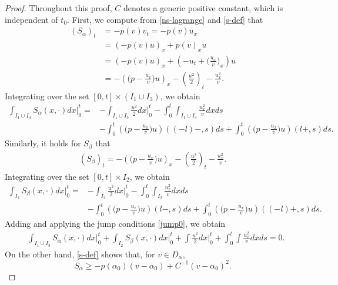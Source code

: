 \documentclass[a4paper,oneside,11pt]{article}
\numberwithin{equation}{section}
\begin{document}
\begin{proof}
Throughout this proof, \( C \) denotes a generic positive constant, which is independent of \( t_{0} \). First, we compute from \eqref{ns-lagrange} and \eqref{s-def} that
\begin{align*}
\left(S_\alpha\right)_t&=-p(v)v_t=-p(v)u_x\\
&=\left(-p(v)u\right)_x+p(v)_xu\\
&=\left(-p(v)u\right)_x+\left(-u_t+\big(\frac{u_{x}}{v}\big)_{x}\right)u\\
&=-\left(\big(p-\frac{u_{x}}{v}\big)u\right)_x-\left(\frac{u^2}{2}\right)_t-\frac{u_{x}^2}{v}.
\end{align*}
Integrating over the set \( [0, t] \times(I_1\cup I_3) \), we obtain
 \begin{align*}
 \int_{I_1\cup I_3} S_\alpha(x, \cdot) d x\Big|_0^{t}=&-\int_{I_1\cup I_3} \frac{u^2}{2}d x\Big|_0^{t}-\int_0^t \int_{I_1\cup I_3}\frac{u_{x}^2}{v}d x d s\\&-\int_0^t\left(\big(p-\frac{u_{x}}{v}\big)u\right)((-l)-, s)d s+\int_0^t\left(\big(p-\frac{u_{x}}{v}\big)u\right)(l+, s)d s.
\end{align*}
Similarly, it holds for \( S_\beta \) that
\begin{align*}
\left(S_\beta\right)_t=-\left(\big(p-\frac{u_{x}}{v}\big)u\right)_x-\left(\frac{u^2}{2}\right)_t-\frac{u_{x}^2}{v}.
\end{align*}
Integrating over the set \( [0, t] \times I_2 \), we obtain
 \begin{align*}
 \int_{I_2} S_\beta(x, \cdot) d x\Big|_0^{t}=&-\int_{I_2} \frac{u^2}{2}d x\Big|_0^{t}-\int_0^t \int_{I_2}\frac{u_{x}^2}{v}d x d s\\&-\int_0^t\left(\big(p-\frac{u_{x}}{v}\big)u\right)(l-, s)d s+\int_0^t\left(\big(p-\frac{u_{x}}{v}\big)u\right)((-l)+, s)d s.
 \end{align*}
Adding and applying the jump conditions \eqref{jump0}, we obtain 
 \begin{equation}\label{slr1}
\begin{aligned}
 &\int_{I_1\cup I_3} S_\alpha(x, \cdot) d x\Big|_0^{t}+\int_{I_2} S_\beta(x, \cdot) d x\Big|_0^{t}%
 +\int\frac{u^2}{2} d x\Big|_0^{t}+\int_0^t \int \frac{u_{x}^2}{v} d x d s=0.
 \end{aligned}   
 \end{equation}  
On the other hand, \eqref{s-def} shows that, for \( v \in D_{\alpha} \),
\[
S_\alpha\geq -p(\alpha_0)(v-\alpha_0)+C^{-1}(v-\alpha_0)^2.
\]
\end{proof}
\end{document}
